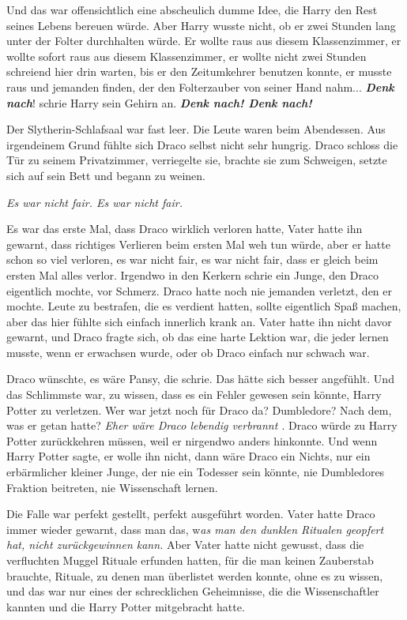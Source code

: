 Und das war offensichtlich eine abscheulich dumme Idee, die Harry den Rest
seines Lebens bereuen würde. Aber Harry wusste nicht, ob er zwei Stunden lang
unter der Folter durchhalten würde. Er wollte raus aus diesem Klassenzimmer, er
wollte sofort raus aus diesem Klassenzimmer, er wollte nicht zwei Stunden
schreiend hier drin warten, bis er den Zeitumkehrer benutzen konnte, er musste
raus und jemanden finden, der den Folterzauber von seiner Hand nahm...
\textbf{}
\textbf{\emph{Denk nach}}! schrie Harry sein Gehirn an. \textbf{\emph{Denk nach!
Denk nach! }}

Der Slytherin-Schlafsaal war fast leer. Die Leute waren beim Abendessen. Aus
irgendeinem Grund fühlte sich Draco selbst nicht sehr hungrig. Draco schloss die
Tür zu seinem Privatzimmer, verriegelte sie, brachte sie zum Schweigen, setzte
sich auf sein Bett und begann zu weinen.

\emph{ Es war nicht fair. Es war nicht fair.}

Es war das erste Mal, dass Draco wirklich verloren hatte, Vater hatte ihn
gewarnt, dass richtiges Verlieren beim ersten Mal weh tun würde, aber er hatte
schon so viel verloren, es war nicht fair, es war nicht fair, dass er gleich
beim ersten Mal alles verlor. Irgendwo in den Kerkern schrie ein Junge, den
Draco eigentlich mochte, vor Schmerz. Draco hatte noch nie jemanden verletzt,
den er mochte. Leute zu bestrafen, die es verdient hatten, sollte eigentlich
Spaß machen, aber das hier fühlte sich einfach innerlich krank an. Vater hatte
ihn nicht davor gewarnt, und Draco fragte sich, ob das eine harte Lektion war,
die jeder lernen musste, wenn er erwachsen wurde, oder ob Draco einfach nur
schwach war.

Draco wünschte, es wäre Pansy, die schrie. Das hätte sich besser angefühlt. Und
das Schlimmste war, zu wissen, dass es ein Fehler gewesen sein könnte, Harry
Potter zu verletzen. Wer war jetzt noch für Draco da? Dumbledore? Nach dem, was
er getan hatte? \emph{Eher wäre Draco lebendig verbrannt}
\emph{.}
Draco würde zu Harry Potter zurückkehren müssen, weil er nirgendwo anders
hinkonnte. Und wenn Harry Potter sagte, er wolle ihn nicht, dann wäre Draco ein
Nichts, nur ein erbärmlicher kleiner Junge, der nie ein Todesser sein könnte,
nie Dumbledores Fraktion beitreten, nie Wissenschaft lernen.

Die Falle war perfekt gestellt, perfekt ausgeführt worden. Vater hatte Draco
immer wieder gewarnt, dass man das, w\emph{as man den dunklen Ritualen geopfert
hat, nicht zurückgewinnen kann.} Aber Vater hatte nicht gewusst, dass die
verfluchten Muggel Rituale erfunden hatten, für die man keinen Zauberstab
brauchte, Rituale, zu denen man überlistet werden konnte, ohne es zu wissen, und
das war nur eines der schrecklichen Geheimnisse, die die Wissenschaftler kannten
und die Harry Potter mitgebracht hatte.

